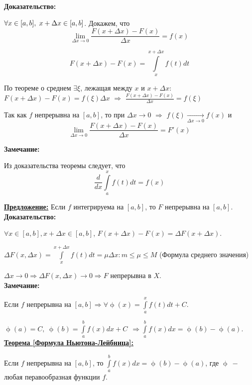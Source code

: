 \documentclass[a4paper,12pt]{article} %
\begin{document}
\textbf{Доказательство:}

$ \forall x \in [a, b], \hspace{1mm} x + \Delta x \in [a, b] $. Докажем, что $$ \lim\limits_{\Delta x  \rightarrow 0} \frac{F(x + \Delta x) - F(x) }{\Delta x} = f (x)$$

$$\displaystyle F(x + \Delta x) - F(x) = \int\limits_x^{x + \Delta x} f(t)dt$$

По теореме о среднем $\exists \xi$, лежащая между $ x $ и $ x + \Delta x:$ $ F(x + \Delta x ) - F(x) = f(\xi) \Delta x$ $\Rightarrow$ $\displaystyle \frac{F(x + \Delta x) - F(x)}{\Delta x} = f(\xi)$

Так как $ f $ непрерывна на $ [a,b] $, то при $ \Delta x \rightarrow 0$ $\Rightarrow$ $f (\xi) \xrightarrow[\Delta x \rightarrow 0]{} f (x)$ и \\ [2mm]

$$ \lim\limits_{\Delta x  \rightarrow 0} \frac{F(x + \Delta x) - F(x) }{\Delta x} = F' (x)$$ 

\textbf{Замечание:}

Из доказательства теоремы следует, что
$$\frac{d}{dx} \int\limits_a^x f(t)dt = f(x)$$

\underline{\textbf{Предложение:}} Если $f$ интегрируема на $[a,b]$, то $F$ непрерывна на $[a,b]$.\\

\textbf{Доказательство:}

$\forall x \in [a,b], x+\Delta x\in [a,b]$, $F (x+ \Delta x ) - F(x) = \Delta F(x+\Delta x)$.

$\Delta F(x, \Delta x) = \int\limits_x^{x + \Delta x} f(t)dt = \mu \Delta x : m \leq \mu \leq M $ (Формула среднего значения)

$\Delta x \rightarrow 0 \Rightarrow \Delta F(x, \Delta x) \rightarrow 0 \Rightarrow F$ непрерывна в $X$.\\

\textbf{Замечание:}

Если $f$ непрерывна на $[a,b] \Rightarrow \forall \upphi(x) =\int\limits_a^{x} f(t)dt +C $.

$\upphi(a) = C,~ \upphi(b)= \int\limits_a^{b} f(x)dx + C ~~\Rightarrow\int\limits_a^b f(x)dx = \upphi(b)-  \upphi(a) $.\\

\underline{\textbf{Теорема [Формула Ньютона-Лейбница]:}}

Если $f$ непрерывна на $[a,b]$, то $\int\limits_a^{b} f(x)dx = \upphi(b)-  \upphi(a) $, где $\upphi ~-~$ любая перавообразная функции $f$.\\
\end{document}
